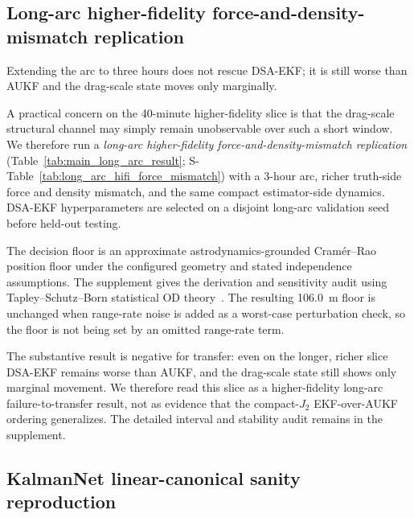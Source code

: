 \documentclass{article}
\begin{document}


\subsection{Long-arc higher-fidelity force-and-density-mismatch replication}\label{sec:long-arc-hifi}
Extending the arc to three hours does not rescue DSA-EKF; it is still worse than AUKF and the drag-scale state moves only marginally.

A practical concern on the 40-minute higher-fidelity slice is that the drag-scale structural channel may simply remain unobservable over such a short window. We therefore run a \emph{long-arc higher-fidelity force-and-density-mismatch replication} (Table~\ref{tab:main_long_arc_result}; S-Table~\ref{tab:long_arc_hifi_force_mismatch}) with a 3-hour arc, richer truth-side force and density mismatch, and the same compact estimator-side dynamics. DSA-EKF hyperparameters are selected on a disjoint long-arc validation seed before held-out testing.

The decision floor is an approximate astrodynamics-grounded Cram\'er--Rao position floor under the configured geometry and stated independence assumptions. The supplement gives the derivation and sensitivity audit using Tapley--Schutz--Born statistical OD theory~\cite{tapley2004statistical}. The resulting 106.0~m floor is unchanged when range-rate noise is added as a worst-case perturbation check, so the floor is not being set by an omitted range-rate term.

The substantive result is negative for transfer: even on the longer, richer slice DSA-EKF remains worse than AUKF, and the drag-scale state still shows only marginal movement. We therefore read this slice as a higher-fidelity long-arc failure-to-transfer result, not as evidence that the compact-$J_2$ EKF-over-AUKF ordering generalizes. The detailed interval and stability audit remains in the supplement.



\subsection{KalmanNet linear-canonical sanity reproduction}\label{sec:kalmannet-faithful}
\end{document}
